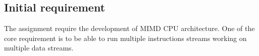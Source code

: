 \subsection {Initial requirement}
The assignment require the development of MIMD CPU architecture. One of the core requirement is to be able to run multiple instructions streams working on multiple data streams. 
